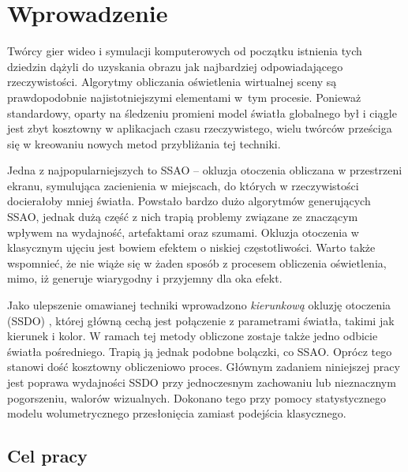 \chapter{Wprowadzenie}
\label{t:wprowadzenie}

	
	Twórcy gier wideo i symulacji komputerowych od początku istnienia tych dziedzin dążyli do uzyskania obrazu jak najbardziej odpowiadającego rzeczywistości. Algorytmy obliczania oświetlenia wirtualnej sceny są prawdopodobnie najistotniejszymi elementami w~tym procesie. Ponieważ standardowy, oparty na śledzeniu promieni model światła globalnego był i ciągle jest zbyt kosztowny w aplikacjach czasu rzeczywistego, wielu twórców prześciga się w kreowaniu nowych metod przybliżania tej techniki. 
	
	Jedna z najpopularniejszych to SSAO -- okluzja otoczenia obliczana w przestrzeni ekranu, symulująca zacienienia w miejscach, do których w rzeczywistości docierałoby mniej światła. Powstało bardzo dużo algorytmów generujących SSAO, jednak dużą część z nich trapią problemy związane ze znaczącym wpływem na wydajność, artefaktami oraz szumami. Okluzja otoczenia w klasycznym ujęciu jest bowiem efektem o niskiej częstotliwości. Warto także wspomnieć, że nie wiąże się w żaden sposób z procesem obliczenia oświetlenia, mimo, iż generuje wiarygodny i przyjemny dla oka efekt.
	
	Jako ulepszenie omawianej techniki wprowadzono \emph{kierunkową} okluzję otoczenia (SSDO) \cite{ssdo}, której główną cechą jest połączenie z parametrami światła, takimi jak kierunek i kolor. W ramach tej metody obliczone zostaje także jedno odbicie światła pośredniego. Trapią ją jednak podobne bolączki, co SSAO. Oprócz tego stanowi dość kosztowny obliczeniowo proces. Głównym zadaniem niniejszej pracy jest poprawa wydajności SSDO przy jednoczesnym zachowaniu lub nieznacznym pogorszeniu, walorów wizualnych. Dokonano tego przy pomocy statystycznego modelu wolumetrycznego przesłonięcia \cite{statvo} zamiast podejścia klasycznego.
		
	\section{Cel pracy}
	\label{t:wprowadzenie:cel}
	
	
